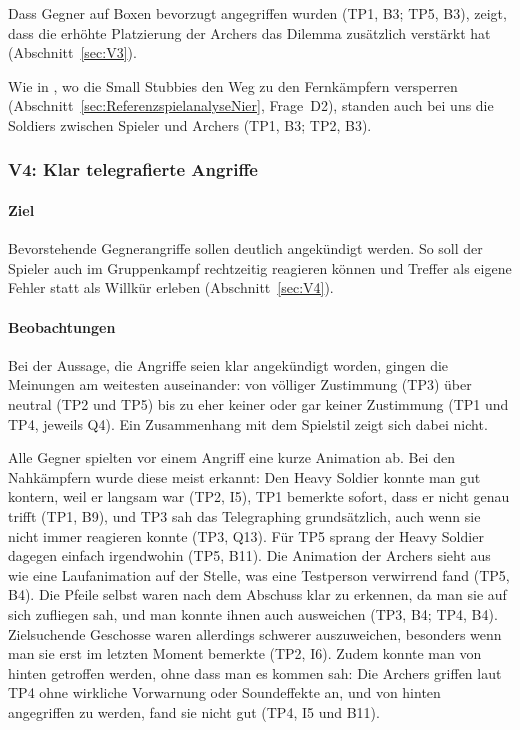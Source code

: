 \documentclass[../Main.tex]{subfiles}
\begin{document}
Dass Gegner auf Boxen bevorzugt angegriffen wurden (TP1, B3; TP5, B3), zeigt, dass die erhöhte Platzierung der Archers das Dilemma zusätzlich verstärkt hat (Abschnitt~\ref{sec:V3}).

Wie in , wo die Small Stubbies den Weg zu den Fernkämpfern versperren (Abschnitt~\ref{sec:ReferenzspielanalyseNier}, Frage~D2), standen auch bei uns die Soldiers zwischen Spieler und Archers (TP1, B3; TP2, B3).

\subsubsection{V4: Klar telegrafierte Angriffe}

\paragraph{Ziel}
Bevorstehende Gegnerangriffe sollen deutlich angekündigt werden. So soll der Spieler auch im Gruppenkampf rechtzeitig reagieren können und Treffer als eigene Fehler statt als Willkür erleben (Abschnitt~\ref{sec:V4}).

\paragraph{Beobachtungen}
Bei der Aussage, die Angriffe seien klar angekündigt worden, gingen die Meinungen am weitesten auseinander: von völliger Zustimmung (TP3) über neutral (TP2 und TP5) bis zu eher keiner oder gar keiner Zustimmung (TP1 und TP4, jeweils Q4). Ein Zusammenhang mit dem Spielstil zeigt sich dabei nicht.

Alle Gegner spielten vor einem Angriff eine kurze Animation ab. Bei den Nahkämpfern wurde diese meist erkannt: Den Heavy Soldier konnte man gut kontern, weil er langsam war (TP2, I5), TP1 bemerkte sofort, dass er nicht genau trifft (TP1, B9), und TP3 sah das Telegraphing grundsätzlich, auch wenn sie nicht immer reagieren konnte (TP3, Q13). Für TP5 sprang der Heavy Soldier dagegen einfach irgendwohin (TP5, B11). Die Animation der Archers sieht aus wie eine Laufanimation auf der Stelle, was eine Testperson verwirrend fand (TP5, B4). Die Pfeile selbst waren nach dem Abschuss klar zu erkennen, da man sie auf sich zufliegen sah, und man konnte ihnen auch ausweichen (TP3, B4; TP4, B4). Zielsuchende Geschosse waren allerdings schwerer auszuweichen, besonders wenn man sie erst im letzten Moment bemerkte (TP2, I6). Zudem konnte man von hinten getroffen werden, ohne dass man es kommen sah: Die Archers griffen laut TP4 ohne wirkliche Vorwarnung oder Soundeffekte an, und von hinten angegriffen zu werden, fand sie nicht gut (TP4, I5 und B11).
\end{document}

